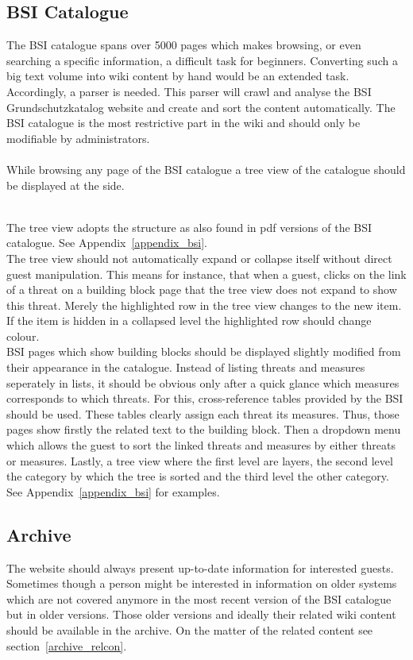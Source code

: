 \subsection{BSI Catalogue}
\label{BSIc}
The BSI catalogue spans over 5000 pages which makes browsing, or even searching a specific information, a difficult task for beginners. 
Converting such a big text volume into wiki content by hand would be an extended task. 
Accordingly, a parser is needed. 
This parser will crawl and analyse the BSI Grundschutzkatalog website and create and sort the content automatically. 
The BSI catalogue is the most restrictive part in the wiki and should only be modifiable by administrators.
\\\\
While browsing any page of the BSI catalogue a tree view of the catalogue should be displayed at the side.
\\\\
\begin{tcolorbox}[breakable,colback=red!10,colframe=red!40!black,title=UPDATE 13/11/2017]
The tree view adopts the structure as also found in pdf versions of the BSI catalogue. 
See Appendix~\ref{appendix_bsi}.\\
The tree view should not automatically expand or collapse itself without direct guest manipulation.
This means for instance, that when a guest, clicks on the link of a threat on a building block page that the tree view does not expand to show this threat.
Merely the highlighted row in the tree view changes to the new item.
If the item is hidden in a collapsed level the highlighted row should change colour.
\\
BSI pages which show building blocks should be displayed slightly modified from their appearance in the catalogue.
Instead of listing threats and measures seperately in lists, it should be obvious only after a quick glance which measures corresponds to which threats.
For this, cross-reference tables provided by the BSI should be used.
These tables clearly assign each threat its measures.
Thus, those pages show firstly the related text to the building block.
Then a dropdown menu which allows the guest to sort the linked threats and measures by either threats or measures.
Lastly, a tree view where the first level are layers, the second level the category by which the tree is sorted and the third level the other category.
See Appendix~\ref{appendix_bsi} for examples.
\end{tcolorbox}


\subsection{Archive}
\label{archive}
The website should always present up-to-date information for interested guests.
Sometimes though a person might be interested in information on older systems which are not covered anymore in the most recent version of the BSI catalogue but in older versions.
Those older versions and ideally their related wiki content should be available in the archive. 
On the matter of the related content see section~\ref{archive_relcon}.

